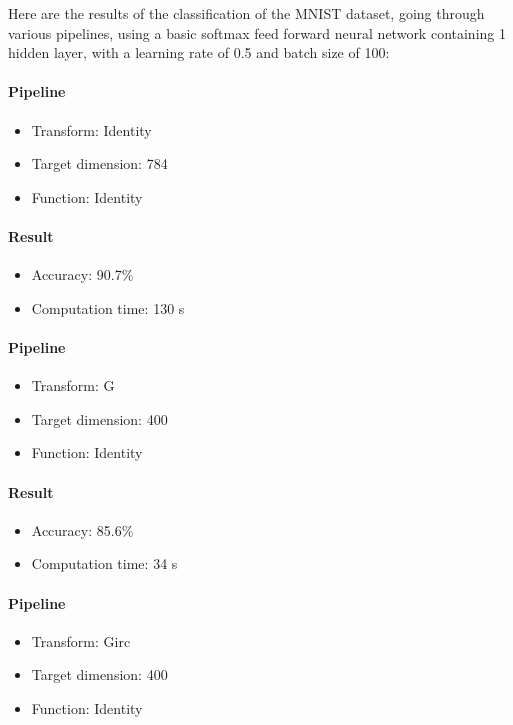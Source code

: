 \documentclass[11pt,a4paper]{article}
\begin{document}
	
	Here are the results of the classification of the MNIST dataset, going through various pipelines, using a basic softmax feed forward neural network containing 1 hidden layer, with a learning rate of 0.5 and batch size of 100:
	

	
	\paragraph{Pipeline}
	\begin{itemize}
			\item Transform: Identity
			\item Target dimension: 784
			\item Function: Identity
	\end{itemize}
	 \paragraph{Result}
	 \begin{itemize}
			\item Accuracy: 90.7\%
			\item Computation time: 130 s
	\end{itemize}



	\paragraph{Pipeline}
	\begin{itemize}
		\item Transform: G
		\item Target dimension: 400
		\item Function: Identity
	\end{itemize}
	\paragraph{Result}
	\begin{itemize}
		\item Accuracy: 85.6\%
		\item Computation time: 34 s
	\end{itemize}
	
	
		\paragraph{Pipeline}
		\begin{itemize}
			\item Transform: Girc
			\item Target dimension: 400
			\item Function: Identity
		\end{itemize}
\end{document}
